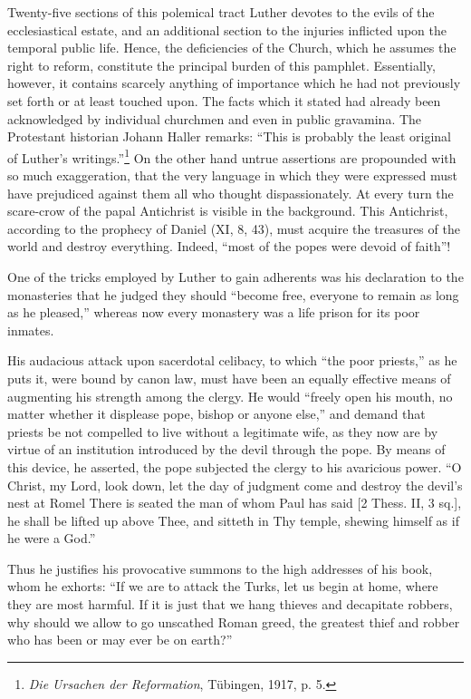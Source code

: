 Twenty-five sections of this polemical tract Luther devotes to
the evils of the ecclesiastical estate, and an additional section to the
injuries inflicted upon the temporal public life. Hence, the deficiencies
of the Church, which he assumes the right to reform, constitute the
principal burden of this pamphlet. Essentially, however, it contains
scarcely anything of importance which he had not previously set
forth or at least touched upon. The facts which it stated had already
been acknowledged by individual churchmen and even in public
gravamina. The Protestant historian Johann Haller remarks: “This
is probably the least original of Luther’s writings.”\footnote
{\textit{Die Ursachen der Reformation}, Tübingen, 1917, p. 5.}
On the other
hand untrue assertions are propounded with so much exaggeration,
that the very language in which they were expressed must have prejudiced
against them all who thought dispassionately. At every turn
the scare-crow of the papal Antichrist is visible in the background.
This Antichrist, according to the prophecy of Daniel (XI, 8, 43),
must acquire the treasures of the world and destroy everything. Indeed,
“most of the popes were devoid of faith”!

One of the tricks employed by Luther to gain adherents was his declaration
to the monasteries that he judged they should “become free, everyone
to remain as long as he pleased,” whereas now every monastery was a life
prison for its poor inmates.

His audacious attack upon sacerdotal celibacy, to which “the poor
priests,” as he puts it, were bound by canon law, must have been an equally
effective means of augmenting his strength among the clergy. He would
“freely open his mouth, no matter whether it displease pope, bishop or anyone
else,” and demand that priests be not compelled to live without a legitimate
wife, as they now are by virtue of an institution introduced by the devil
through the pope. By means of this device, he asserted, the pope subjected
the clergy to his avaricious power. “O Christ, my Lord, look down, let the
day of judgment come and destroy the devil’s nest at Romel There is seated
the man of whom Paul has said [2 Thess. II, 3 sq.], he shall be lifted up
above Thee, and sitteth in Thy temple, shewing himself as if he were a
God.”

Thus he justifies his provocative summons to the high addresses of his
book, whom he exhorts: “If we are to attack the Turks, let us begin at
home, where they are most harmful. If it is just that we hang thieves and
decapitate robbers, why should we allow to go unscathed Roman greed,
the greatest thief and robber who has been or may ever be on earth?”

